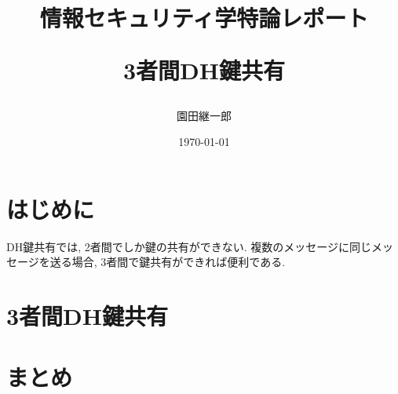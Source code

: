\documentclass[a4paper,11pt]{jsarticle}
\begin{document}
\title{情報セキュリティ学特論レポート

3者間DH鍵共有}
\author{園田継一郎}
\date{\today}
\maketitle

\section{はじめに}
DH鍵共有では, 2者間でしか鍵の共有ができない.
複数のメッセージに同じメッセージを送る場合, 
3者間で鍵共有ができれば便利である.
\section{3者間DH鍵共有}

\section{まとめ}
\end{document}

